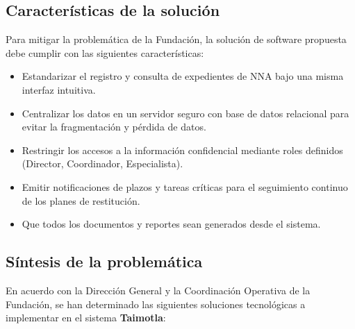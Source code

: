 \subsection{Características de la solución}

Para mitigar la problemática de la Fundación, la solución de software propuesta debe cumplir con las siguientes características:
\begin{itemize}
	\item Estandarizar el registro y consulta de expedientes de NNA bajo una misma interfaz intuitiva.
	\item Centralizar los datos en un servidor seguro con base de datos relacional para evitar la fragmentación y pérdida de datos.
	\item Restringir los accesos a la información confidencial mediante roles definidos (Director, Coordinador, Especialista).
	\item Emitir notificaciones de plazos y tareas críticas para el seguimiento continuo de los planes de restitución.
	\item Que todos los documentos y reportes sean generados desde el sistema.
\end{itemize}

\subsection{Síntesis de la problemática}

En acuerdo con la Dirección General y la Coordinación Operativa de la Fundación, se han determinado las siguientes soluciones tecnológicas a implementar en el sistema \textbf{Taimotla}:


